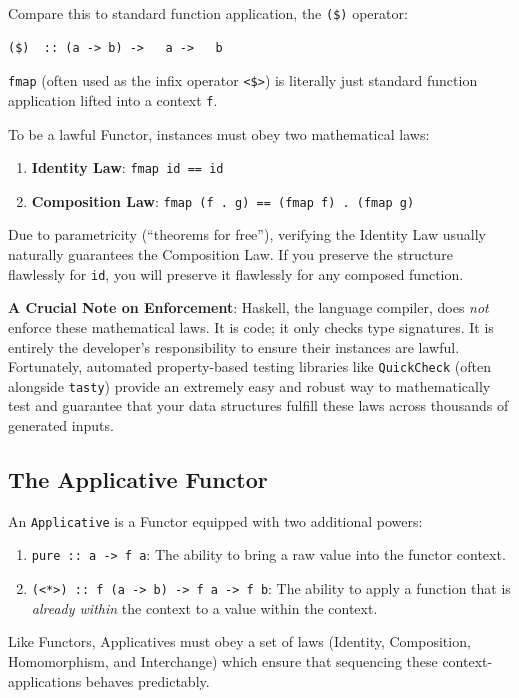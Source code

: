 \documentclass[12pt,a4paper]{article}
\begin{document}
Compare this to standard function application, the \texttt{(\$)} operator:
\begin{lstlisting}
($)  :: (a -> b) ->   a ->   b
\end{lstlisting}
\texttt{fmap} (often used as the infix operator \texttt{<\$>}) is literally just standard function application lifted into a context \texttt{f}.

To be a lawful Functor, instances must obey two mathematical laws:
\begin{enumerate}
    \item \textbf{Identity Law}: \texttt{fmap id == id}
    \item \textbf{Composition Law}: \texttt{fmap (f . g) == (fmap f) . (fmap g)}
\end{enumerate}

Due to parametricity (``theorems for free''), verifying the Identity Law usually naturally guarantees the Composition Law. If you preserve the structure flawlessly for \texttt{id}, you will preserve it flawlessly for any composed function.

\textbf{A Crucial Note on Enforcement}: Haskell, the language compiler, does \textit{not} enforce these mathematical laws. It is code; it only checks type signatures. It is entirely the developer's responsibility to ensure their instances are lawful. Fortunately, automated property-based testing libraries like \texttt{QuickCheck} (often alongside \texttt{tasty}) provide an extremely easy and robust way to mathematically test and guarantee that your data structures fulfill these laws across thousands of generated inputs.

\subsection{The Applicative Functor}

An \texttt{Applicative} is a Functor equipped with two additional powers:
\begin{enumerate}
    \item \texttt{pure :: a -> f a}: The ability to bring a raw value into the functor context.
    \item \texttt{(<*>) :: f (a -> b) -> f a -> f b}: The ability to apply a function that is \textit{already within} the context to a value within the context.
\end{enumerate}

Like Functors, Applicatives must obey a set of laws (Identity, Composition, Homomorphism, and Interchange) which ensure that sequencing these context-applications behaves predictably.
\end{document}

